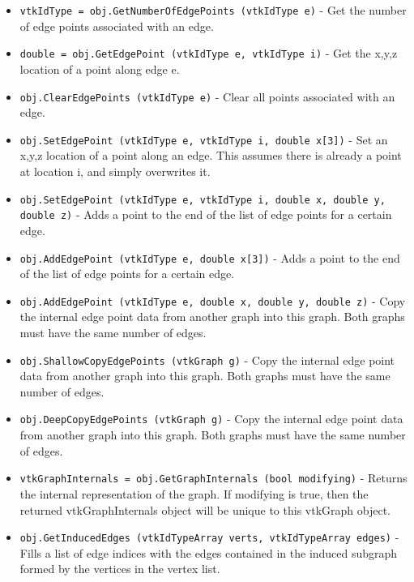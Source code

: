 \begin{itemize}
\item  \verb|vtkIdType = obj.GetNumberOfEdgePoints (vtkIdType e)| -  Get the number of edge points associated with an edge.

\item  \verb|double = obj.GetEdgePoint (vtkIdType e, vtkIdType i)| -  Get the x,y,z location of a point along edge e.

\item  \verb|obj.ClearEdgePoints (vtkIdType e)| -  Clear all points associated with an edge.

\item  \verb|obj.SetEdgePoint (vtkIdType e, vtkIdType i, double x[3])| -  Set an x,y,z location of a point along an edge.
 This assumes there is already a point at location i, and simply
 overwrites it.

\item  \verb|obj.SetEdgePoint (vtkIdType e, vtkIdType i, double x, double y, double z)| -  Adds a point to the end of the list of edge points for a certain edge.

\item  \verb|obj.AddEdgePoint (vtkIdType e, double x[3])| -  Adds a point to the end of the list of edge points for a certain edge.

\item  \verb|obj.AddEdgePoint (vtkIdType e, double x, double y, double z)| -  Copy the internal edge point data from another graph into this graph.
 Both graphs must have the same number of edges.

\item  \verb|obj.ShallowCopyEdgePoints (vtkGraph g)| -  Copy the internal edge point data from another graph into this graph.
 Both graphs must have the same number of edges.

\item  \verb|obj.DeepCopyEdgePoints (vtkGraph g)| -  Copy the internal edge point data from another graph into this graph.
 Both graphs must have the same number of edges.

\item  \verb|vtkGraphInternals = obj.GetGraphInternals (bool modifying)| -  Returns the internal representation of the graph. If modifying is
 true, then the returned vtkGraphInternals object will be unique to
 this vtkGraph object.

\item  \verb|obj.GetInducedEdges (vtkIdTypeArray verts, vtkIdTypeArray edges)| -  Fills a list of edge indices with the edges contained in the induced
 subgraph formed by the vertices in the vertex list.


\end{itemize}
